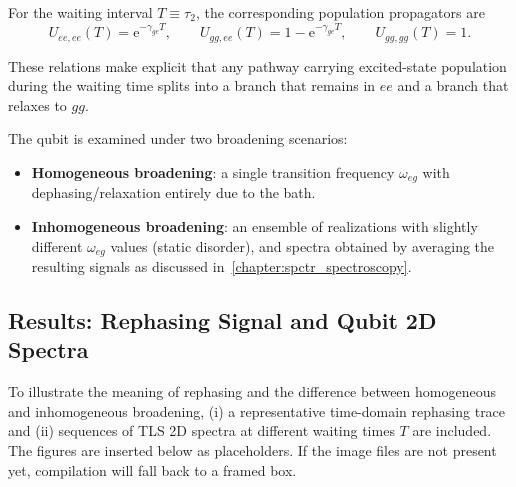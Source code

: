 For the waiting interval $T\equiv\tau_2$, the corresponding population propagators are
\begin{equation*}
U_{ee,ee}(T)=\mathrm{e}^{-\gamma_{ge}T},\qquad
U_{gg,ee}(T)=1-\mathrm{e}^{-\gamma_{ge}T},\qquad
U_{gg,gg}(T)=1.
\end{equation*}

These relations make explicit that any pathway carrying excited-state population during the waiting time splits into a branch that remains in $ee$ and a branch that relaxes to $gg$.

The qubit is examined under two broadening scenarios:
\begin{itemize}
	\item \textbf{Homogeneous broadening}: a single transition frequency $\omega_{eg}$ with dephasing/relaxation entirely due to the bath.
	\item \textbf{Inhomogeneous broadening}: an ensemble of realizations with slightly different $\omega_{eg}$ values (static disorder), and spectra obtained by averaging the resulting signals as discussed in~\autoref{chapter:spctr_spectroscopy}.
\end{itemize}

\subsection{Results: Rephasing Signal and Qubit 2D Spectra}


To illustrate the meaning of rephasing and the difference between homogeneous and inhomogeneous broadening, (i) a representative time-domain rephasing trace and (ii) sequences of TLS 2D spectra at different waiting times $T$ are included. The figures are inserted below as placeholders. If the image files are not present yet, compilation will fall back to a framed box.

